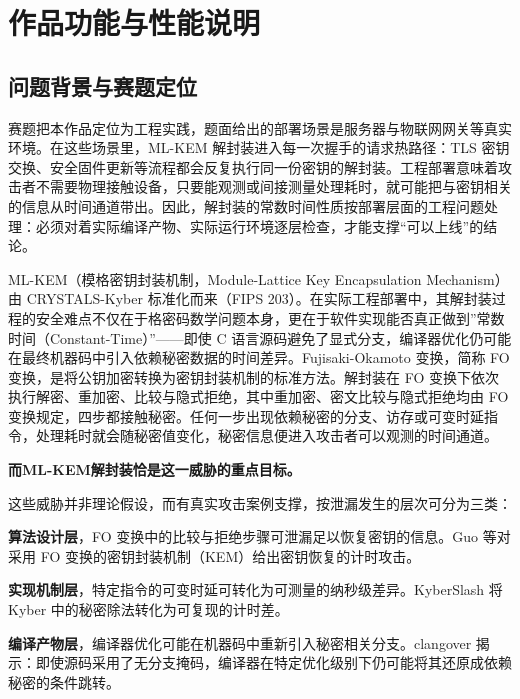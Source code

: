 
\section{作品功能与性能说明}

\subsection{问题背景与赛题定位}

赛题把本作品定位为工程实践，题面给出的部署场景是服务器与物联网网关等真实环境。在这些场景里，ML-KEM 解封装进入每一次握手的请求热路径：TLS 密钥交换、安全固件更新等流程都会反复执行同一份密钥的解封装。工程部署意味着攻击者不需要物理接触设备，只要能观测或间接测量处理耗时，就可能把与密钥相关的信息从时间通道带出。因此，解封装的常数时间性质按部署层面的工程问题处理：必须对着实际编译产物、实际运行环境逐层检查，才能支撑“可以上线”的结论。

ML-KEM（模格密钥封装机制，Module-Lattice Key Encapsulation Mechanism）由 CRYSTALS-Kyber 标准化而来（FIPS 203\cite{fips203,kyber2018}）。在实际工程部署中，其解封装过程的安全难点不仅在于格密码数学问题本身，更在于软件实现能否真正做到”常数时间（Constant-Time）”——即使 C 语言源码避免了显式分支，编译器优化仍可能在最终机器码中引入依赖秘密数据的时间差异。Fujisaki-Okamoto 变换，简称 FO 变换，是将公钥加密转换为密钥封装机制的标准方法。解封装在 FO 变换下依次执行解密、重加密、比较与隐式拒绝，其中重加密、密文比较与隐式拒绝均由 FO 变换规定，四步都接触秘密。任何一步出现依赖秘密的分支、访存或可变时延指令，处理耗时就会随秘密值变化，秘密信息便进入攻击者可以观测的时间通道。

\textbf{而ML-KEM解封装恰是这一威胁的重点目标。}

这些威胁并非理论假设，而有真实攻击案例支撑，按泄漏发生的层次可分为三类：

\textbf{算法设计层}，FO 变换中的比较与拒绝步骤可泄漏足以恢复密钥的信息。Guo 等对采用 FO 变换的密钥封装机制（KEM）给出密钥恢复的计时攻击\cite{guo2020}。

\textbf{实现机制层}，特定指令的可变时延可转化为可测量的纳秒级差异。KyberSlash 将 Kyber 中的秘密除法转化为可复现的计时差\cite{kyberslash}。

\textbf{编译产物层}，编译器优化可能在机器码中重新引入秘密相关分支。clangover 揭示：即使源码采用了无分支掩码，编译器在特定优化级别下仍可能将其还原成依赖秘密的条件跳转\cite{clangover}。

